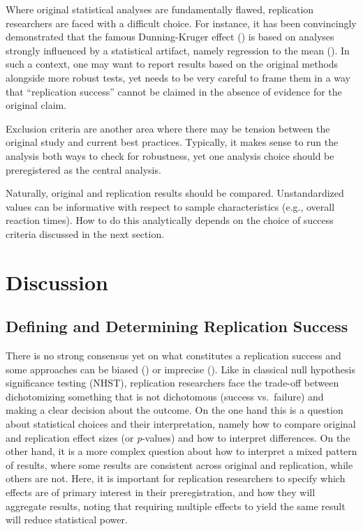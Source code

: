\documentclass[
  letterpaper,
  DIV=11,
  openany,
  fontsize=12pt,
  parskip=half,
  headings=big,
  numbers=noenddot,
  titlepage=false]{scrreprt}
\begin{document}
Where original statistical analyses are fundamentally flawed,
replication researchers are faced with a difficult choice. For instance,
it has been convincingly demonstrated that the famous Dunning-Kruger
effect () is based
on analyses strongly influenced by a statistical artifact, namely
regression to the mean (). In such a context, one may want to report results
based on the original methods alongside more robust tests, yet needs to
be very careful to frame them in a way that ``replication success''
cannot be claimed in the absence of evidence for the original claim.

Exclusion criteria are another area where there may be tension between
the original study and current best practices. Typically, it makes sense
to run the analysis both ways to check for robustness, yet one analysis
choice should be preregistered as the central analysis.

Naturally, original and replication results should be compared.
Unstandardized values can be informative with respect to sample
characteristics (e.g., overall reaction times). How to do this
analytically depends on the choice of success criteria discussed in the
next section.

\chapter{Discussion}\label{discussion-1}

\section{Defining and Determining Replication
Success}\label{sec-success-criteria}

There is no strong consensus yet on what constitutes a replication
success and some approaches can be biased
() or imprecise
(). Like in
classical null hypothesis significance testing (NHST), replication
researchers face the trade-off between dichotomizing something that is
not dichotomous (success vs.~failure) and making a clear decision about
the outcome. On the one hand this is a question about statistical
choices and their interpretation, namely how to compare original and
replication effect sizes (or \emph{p}-values) and how to interpret
differences. On the other hand, it is a more complex question about how
to interpret a mixed pattern of results, where some results are
consistent across original and replication, while others are not. Here,
it is important for replication researchers to specify which effects are
of primary interest in their preregistration, and how they will
aggregate results, noting that requiring multiple effects to yield the
same result will reduce statistical power.
\end{document}
